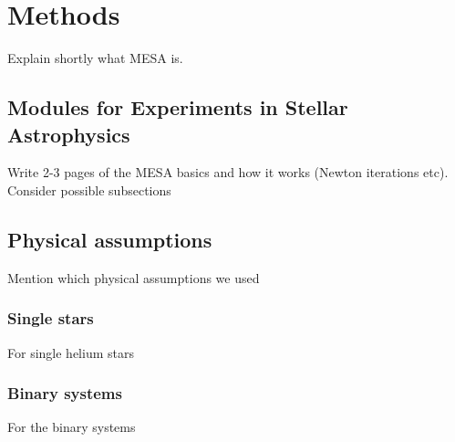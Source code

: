 \documentclass[../../main/thesis_msc.tex]{subfiles}
\begin{document}
    \chapter{Methods}
    
    	Explain shortly what MESA is.
    	
    		\section{Modules for Experiments in Stellar Astrophysics}
    		
    			Write 2-3 pages of the MESA basics and how it works (Newton iterations etc). Consider possible subsections
    			
    		\section{Physical assumptions}
    		
    			Mention which physical assumptions we used
    			
    				\subsection{Single stars}
    				
    					For single helium stars
    					
    				\subsection{Binary systems}
    				
    					For the binary systems
    
    
    
    
\end{document}
